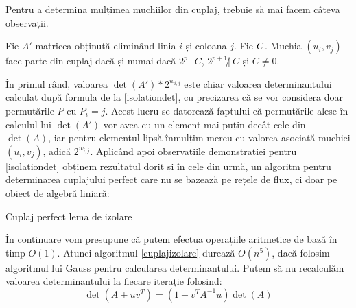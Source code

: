 \pagebreak

Pentru a determina mulțimea muchiilor din cuplaj, trebuie să mai facem câteva observații.

\begin{lem}
  Fie $A'$ matricea obținută eliminând linia $i$ și coloana $j$. Fie
  $C \def \det(A') * \frac{2^{w_{i,j}}}$. Muchia
  $(u_{i}, v_{j})$ face parte din cuplaj dacă și numai dacă $2^{p} \ | \ C$,
  $2^{p+1} \not| \ C$ și $C \neq 0$.
\end{lem}

În primul rând, valoarea $\det(A') * 2^{w_{i,j}}$ este chiar valoarea
determinantului calculat după formula de la \ref{isolationdet}, cu precizarea că
se vor considera doar permutările $P$ cu $P_{i} = j$. Acest lucru se datorează
faptului că permutările alese în calculul lui $\det(A')$ vor avea cu un element
mai puțin decât cele din $\det(A)$, iar pentru elementul lipsă înmulțim mereu cu
valorea asociată muchiei $(u_{i}, v_{j})$, adică $2^{w_{i,j}}$.
Aplicând apoi observațiile demonstrației pentru \ref{isolationdet} obținem
rezultatul dorit și în cele din urmă, un algoritm pentru determinarea cuplajului
perfect care nu se bazează pe rețele de flux, ci doar pe obiect de algebră
liniară: \par

\vspace{5 mm}

\begin{algorithm}[H]
 \label{cuplajizolare}
 \caption{Cuplaj perfect lema de izolare}
\end{algorithm}

\pagebreak

În continuare vom presupune că putem efectua operațiile aritmetice de bază în timp $O(1)$.
Atunci algoritmul \ref{cuplajizolare} durează $O(n^{5})$, dacă folosim
algoritmul lui Gauss pentru calcularea determinantului. Putem să nu recalculăm
valoarea determinantului la fiecare iterație folosind:
\begin{equation}
  \det(A + uv^{T}) = (1 + v^{T} A^{-1} u) \det(A)
\end{equation}

